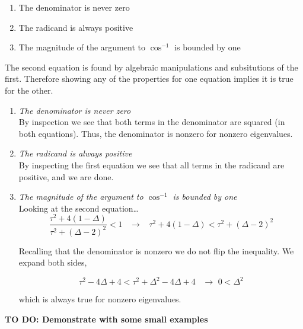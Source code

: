 \documentclass{article}
\begin{document}
\begin{enumerate}
\def\labelenumi{\arabic{enumi}.}
\itemsep1pt\parskip0pt
\item
  The denominator is never zero
\item
  The radicand is always positive
\item
  The magnitude of the argument to $\cos^{-1}$ is bounded by one
\end{enumerate}

The second equation is found by algebraic manipulations and subsitutions
of the first. Therefore showing any of the properties for one equation
implies it is true for the other. \\

\begin{enumerate}
\def\labelenumi{\arabic{enumi}.}
\itemsep1pt\parskip0pt
\item
    \emph{The denominator is never zero} \\
  By inspection we see that both terms in the denominator are
  squared (in both equations). Thus, the denominator is nonzero for
  nonzero eigenvalues. \\
\item
    \emph{The radicand is always positive} \\
By inspecting the first equation we see that all terms in
the radicand are positive, and we are done. \\
\item
    \emph{The magnitude of the argument to $\cos^{-1}$ is bounded by one} \\
Looking at the second equation\ldots{} \\

\[\frac{\tau^2+4(1-\Delta)}{\tau^2+(\Delta-2)^2} < 1 \hspace{10pt} \rightarrow \hspace{10pt} \tau^2+4(1-\Delta) < \tau^2+(\Delta-2)^2\]

Recalling that the denominator is nonzero we do not flip the inequality.
We expand both sides,

\[\tau^2-4\Delta+4 < \tau^2+\Delta^2-4\Delta+4 \hspace{10pt} \rightarrow \hspace{4pt} 0 < \Delta^2\]

which is always true for nonzero eigenvalues. \\

\end{enumerate}

\textbf{TO DO: Demonstrate with some small examples} \\

    
    
    
\end{document}
